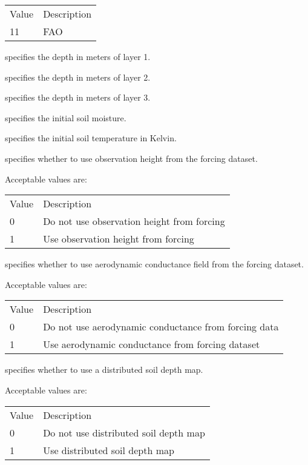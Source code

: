  \begin{tabular}{ll}
 Value & Description \\
  11   & FAO         \\
 \end{tabular}

  specifies the depth in meters
 of layer 1.

  specifies the depth in meters
 of layer 2.

  specifies the depth in meters
 of layer 3.

  specifies the initial soil
 moisture.

  specifies the initial soil
 temperature in Kelvin.

  specifies whether
 to use observation height from the forcing dataset.

 Acceptable values are:

 \begin{tabular}{ll}
 Value & Description                                             \\
 0     & Do not use observation height from forcing              \\
 1     & Use observation height from forcing                     \\
 \end{tabular}

  specifies
 whether to use aerodynamic conductance field from the forcing
 dataset.

 Acceptable values are:

 \begin{tabular}{ll}
 Value & Description                                            \\
 0     & Do not use aerodynamic conductance from forcing data   \\
 1     & Use aerodynamic conductance from forcing dataset       \\
 \end{tabular}

  specifies
 whether to use a distributed soil depth map.

 Acceptable values are:

 \begin{tabular}{ll}
 Value & Description                           \\
 0     & Do not use distributed soil depth map \\
 1     & Use distributed soil depth map        \\
 \end{tabular}
 

